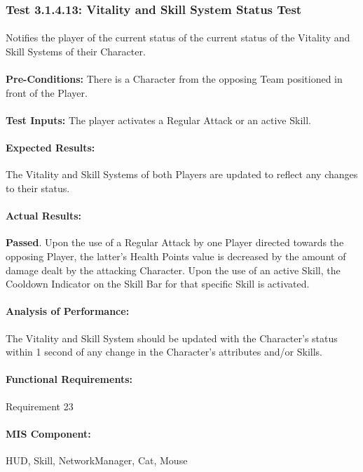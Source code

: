 \documentclass{article}
\begin{document}
     \subsubsection{Test 3.1.4.13: Vitality and Skill System Status Test}
    \paragraph{} Notifies the player of the current status of the current status of the Vitality and Skill Systems of their Character.
    \paragraph{}\textbf{Pre-Conditions:} There is a Character from the opposing Team positioned in front of the Player.
    \paragraph{}\textbf{Test Inputs:} The player activates a Regular Attack or an active Skill.
    \paragraph{Expected Results:} The Vitality and Skill Systems of both Players are updated to reflect any changes to their status.
    \paragraph{Actual Results:} \textbf{Passed}. Upon the use of a Regular Attack by one Player directed towards the opposing Player, the latter's Health Points value is decreased by the amount of damage dealt by the attacking Character. Upon the use of an active Skill, the Cooldown Indicator on the Skill Bar for that specific Skill is activated.
     \paragraph{Analysis of Performance:} The Vitality and Skill System should be updated with the Character's status within 1 second of any change in the Character's attributes and/or Skills.
     \paragraph{Functional Requirements:} Requirement 23
    \paragraph{MIS Component:} HUD, Skill, NetworkManager, Cat, Mouse
    
\end{document}
